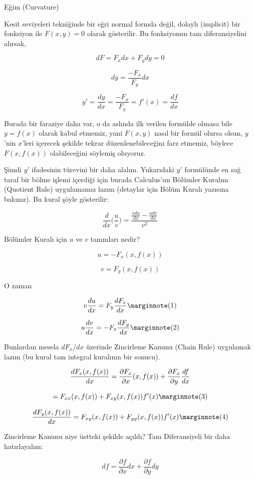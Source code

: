 \documentclass[12pt,fleqn]{article}\usepackage{../../common}
\begin{document}
Eğim (Curvature)

Kesit seviyeleri tekniğinde bir eğri normal formda değil, dolaylı
(implicit) bir fonksiyon ile $F(x,y) = 0$ olarak gösterilir. Bu fonksiyonun
tam diferansiyelini alırsak,

$$ dF = F_x dx + F_y dy = 0  $$

$$ dy = \frac{-F_x}{F_y}dx  $$

$$ y' = \frac{dy}{dx} = \frac{-F_x}{F_y} = f'(x) = \frac{df}{dx} $$

Burada bir faraziye daha var, o da aslında ilk verilen formülde olmasa bile
$y=f(x)$ olarak kabul etmemiz, yani $F(x,y)$ nasıl bir formül olursa olsun,
$y$'nin $x$'leri içerecek şekilde tekrar düzenlenebileceğini farz etmemiz,
böylece $F(x,f(x))$ olabileceğini söylemiş oluyoruz.

Şimdi $y'$ ifadesinin türevini bir daha alalım. Yukarıdaki $y'$ formülünde
en sağ taraf bir bölme işlemi içerdiği için burada Calculus'un Bölümler
Kuralını (Quotient Rule) uygulamamız lazım (detaylar için Bölüm Kuralı
yazısına bakınız). Bu kural şöyle gösterilir:

$$ \frac{d}{dx}\bigg(\frac{u}{v}\bigg) = 
\frac{\displaystyle \frac{v du}{dx} - \frac{u dv}{dx}}{v^2} $$

Bölümler Kuralı için $u$ ve $v$ tanımları nedir? 

$$ u = -F_x(x,f(x))  $$

$$ v = F_y(x,f(x)) $$

O zaman

$$ 
v \frac{du}{dx} = F_y \frac{dF_x}{dx} 
\mlabel{1}
$$

$$
u \frac{dv}{dx} = -F_x \frac{dF_y }{dx} 
\mlabel{2}
$$

Bunlardan mesela $dF_x/dx$ üzerinde Zincirleme Kanunu (Chain Rule) uygulamak
lazım (bu kural tam integral kuralının bir sonucu). 

$$ \frac{d F_x(x,f(x)) }{dx} = \frac{\partial F_x}{\partial  x}(x,f(x))+\frac{\partial F_x}{\partial y}\frac{df}{dx}\\ $$

$$
= F_{xx}(x,f(x))+F_{xy}(x,f(x))f'(x) 
\mlabel{3}
$$

$$
\frac{d F_y(x,f(x)) }{dx} =  F_{xy}(x,f(x))+F_{yy}(x,f(x))f'(x) 
\mlabel{4}
$$

Zincirleme Kanunu niye üstteki şekilde açıldı? Tam Diferansiyeli bir daha
hatırlayalım:

$$ df = \frac{\partial f}{\partial x} dx + \frac{\partial f}{\partial y} dy  $$
\end{document}

